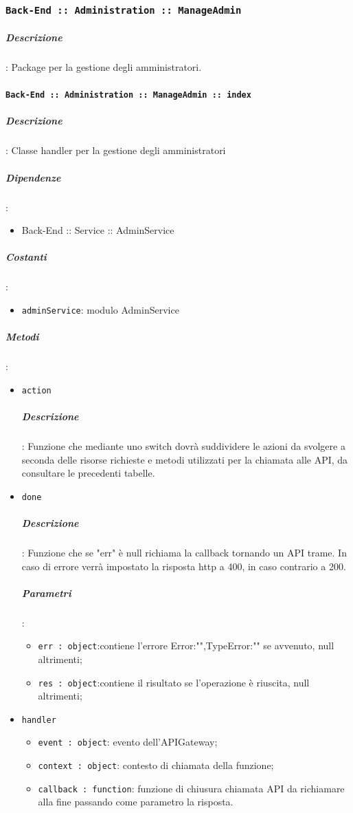 \documentclass[../DefinizioneDiProdotto_v2.0.0.tex]{subfiles}
\begin{document}
\subsubsection{\texttt{Back-End :: Administration :: ManageAdmin}}
\subparagraph{Descrizione}: Package per la gestione degli amministratori.

\paragraph{\texttt{Back-End :: Administration :: ManageAdmin :: index}}
\subparagraph{Descrizione}: Classe handler per la gestione degli amministratori
\subparagraph{Dipendenze}:
\begin{itemize}
	\item	{Back-End :: Service :: AdminService}
\end{itemize}
\subparagraph{Costanti}:
\begin{itemize}
	\item \texttt{adminService}: modulo AdminService
\end{itemize}
\subparagraph{Metodi}:
\begin{itemize}
	\item \texttt{action}
	      \subparagraph{Descrizione}: Funzione che mediante uno switch dovrà suddividere le azioni da svolgere a seconda delle risorse richieste e metodi utilizzati per la chiamata alle API, da consultare le precedenti tabelle.
	\item \texttt{done}
	      \subparagraph{Descrizione}: Funzione che se "err" è null richiama la callback tornando un API trame. In caso di errore verrà impostato la risposta http a 400, in caso contrario a 200.
	      \subparagraph{Parametri}:
	      \begin{itemize}
	      	\item \texttt{err : object}:contiene l'errore {Error:"",TypeError:""} se avvenuto, null altrimenti;
	      	\item \texttt{res : object}:contiene il risultato se l'operazione è riuscita, null altrimenti;
	      \end{itemize}
	\item \texttt{handler}
	      \begin{itemize}
	      	\item \texttt{event : object}: evento dell'APIGateway;
	      	\item \texttt{context : object}: contesto di chiamata della funzione;
	      	\item \texttt{callback : function}: funzione di chiusura chiamata API da richiamare alla fine passando come parametro la risposta.
	      \end{itemize}
\end{itemize}
\end{document}
